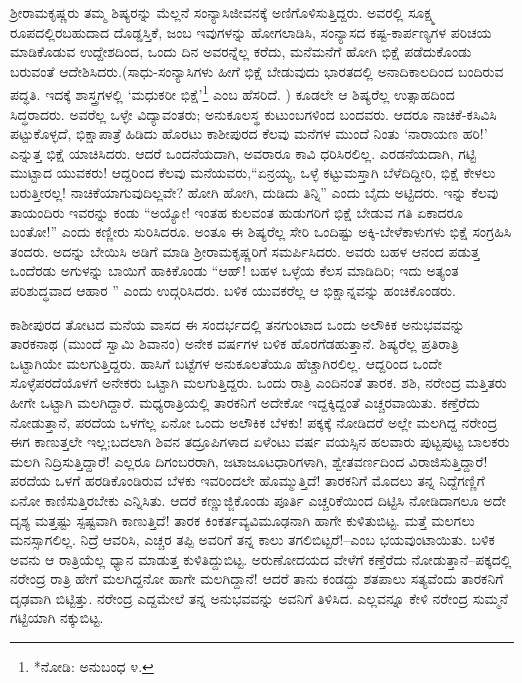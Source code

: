 ಶ್ರೀರಾಮಕೃಷ್ಣರು ತಮ್ಮ ಶಿಷ್ಯರನ್ನು ಮೆಲ್ಲನೆ ಸಂನ್ಯಾಸಿಜೀವನಕ್ಕೆ ಅಣಿಗೊಳಿಸುತ್ತಿದ್ದರು. ಅವರಲ್ಲಿ ಸೂಕ್ಷ್ಮ ರೂಪದಲ್ಲಿರಬಹುದಾದ ದೊಡ್ಡಸ್ತಿಕೆ, ಜಂಬ ಇವುಗಳನ್ನು ಹೋಗಲಾಡಿಸಿ, ಸಂನ್ಯಾಸದ ಕಷ್ಟ-ಕಾರ್ಪಣ್ಯಗಳ ಪರಿಚಯ ಮಾಡಿಕೊಡುವ ಉದ್ದೇಶದಿಂದ, ಒಂದು ದಿನ ಅವರನ್ನೆಲ್ಲ ಕರೆದು, ಮನೆಮನೆಗೆ ಹೋಗಿ ಭಿಕ್ಷೆ ಪಡೆದುಕೊಂಡು ಬರುವಂತೆ ಆದೇಶಿಸಿದರು.(ಸಾಧು-ಸಂನ್ಯಾಸಿಗಳು ಹೀಗೆ ಭಿಕ್ಷೆ ಬೇಡುವುದು ಭಾರತದಲ್ಲಿ ಅನಾದಿಕಾಲದಿಂದ ಬಂದಿರುವ ಪದ್ಧತಿ. ಇದಕ್ಕೆ ಶಾಸ್ತ್ರಗಳಲ್ಲಿ ‘ಮಧುಕರೀ ಭಿಕ್ಷೆ’\footnote{*ನೋಡಿ: ಅನುಬಂಧ ೪.} ಎಂಬ ಹೆಸರಿದೆ. ) ಕೂಡಲೇ ಆ ಶಿಷ್ಯರೆಲ್ಲ ಉತ್ಸಾಹದಿಂದ ಸಿದ್ಧರಾದರು. ಅವರೆಲ್ಲ ಒಳ್ಳೇ ವಿದ್ಯಾವಂತರು; ಅನುಕೂಲಸ್ಥ ಕುಟುಂಬಗಳಿಂದ ಬಂದವರು. ಆದರೂ ನಾಚಿಕೆ-ಕಸಿವಿಸಿ ಪಟ್ಟುಕೊಳ್ಳದೆ, ಭಿಕ್ಷಾಪಾತ್ರೆ ಹಿಡಿದು ಹೊರಟು ಕಾಶೀಪುರದ ಕೆಲವು ಮನೆಗಳ ಮುಂದೆ ನಿಂತು ‘ನಾರಾಯಣ ಹರಿ!’ ಎನ್ನುತ್ತ ಭಿಕ್ಷೆ ಯಾಚಿಸಿದರು. ಆದರೆ ಒಂದನೆಯದಾಗಿ, ಅವರಾರೂ ಕಾವಿ ಧರಿಸಿರಲಿಲ್ಲ. ಎರಡನೆಯದಾಗಿ, ಗಟ್ಟಿ ಮುಟ್ಟಾದ ಯುವಕರು! ಆದ್ದರಿಂದ ಕೆಲವು ಮನೆಯವರು,“ಏನ್ರಯ್ಯ, ಒಳ್ಳೆ ಕಟ್ಟುಮಸ್ತಾಗಿ ಬೆಳೆದಿದ್ದೀರಿ, ಭಿಕ್ಷೆ ಕೇಳಲು ಬರುತ್ತೀರಲ್ಲ! ನಾಚಿಕೆಯಾಗುವುದಿಲ್ಲವೇ? ಹೋಗಿ ಹೋಗಿ, ದುಡಿದು ತಿನ್ನಿ” ಎಂದು ಬೈದು ಅಟ್ಟಿದರು. ಇನ್ನು ಕೆಲವು ತಾಯಂದಿರು ಇವರನ್ನು ಕಂಡು “ಅಯ್ಯೋ! ಇಂತಹ ಕುಲವಂತ ಹುಡುಗರಿಗೆ ಭಿಕ್ಷೆ ಬೇಡುವ ಗತಿ ಏಕಾದರೂ ಬಂತೋ!” ಎಂದು ಕಣ್ಣೀರು ಸುರಿಸಿದರೂ. ಅಂತೂ ಈ ಶಿಷ್ಯರೆಲ್ಲ ಸೇರಿ ಒಂದಿಷ್ಟು ಅಕ್ಕಿ-ಬೇಳೆಕಾಳುಗಳು ಭಿಕ್ಷೆ ಸಂಗ್ರಹಿಸಿ ತಂದರು. ಅದನ್ನು ಬೇಯಿಸಿ ಅಡಿಗೆ ಮಾಡಿ ಶ್ರೀರಾಮಕೃಷ್ಣರಿಗೆ ಸಮರ್ಪಿಸಿದರು. ಅವರು ಬಹಳ ಆನಂದ ಪಡುತ್ತ ಒಂದೆರಡು ಅಗುಳನ್ನು ಬಾಯಿಗೆ ಹಾಕಿಕೊಂಡು “ಆಹ್! ಬಹಳ ಒಳ್ಳೆಯ ಕೆಲಸ ಮಾಡಿದಿರಿ; ಇದು ಅತ್ಯಂತ ಪರಿಶುದ್ಧವಾದ ಆಹಾರ ” ಎಂದು ಉದ್ಗರಿಸಿದರು. ಬಳಿಕ ಯುವಕರೆಲ್ಲ ಆ ಭಿಕ್ಷಾನ್ನವನ್ನು ಹಂಚಿಕೊಂಡರು.

ಕಾಶೀಪುರದ ತೋಟದ ಮನೆಯ ವಾಸದ ಈ ಸಂದರ್ಭದಲ್ಲಿ ತನಗುಂಟಾದ ಒಂದು ಅಲೌಕಿಕ ಅನುಭವವನ್ನು ತಾರಕನಾಥ (ಮುಂದೆ ಸ್ವಾಮಿ ಶಿವಾನಂ) ಅನೇಕ ವರ್ಷಗಳ ಬಳಿಕ ಹೊರಗೆಡಹುತ್ತಾನೆ. ಶಿಷ್ಯರೆಲ್ಲ ಪ್ರತಿರಾತ್ರಿ ಒಟ್ಟಾಗಿಯೇ ಮಲಗುತ್ತಿದ್ದರು. ಹಾಸಿಗೆ ಬಟ್ಟೆಗಳ ಅನುಕೂಲತೆಯೂ ಹೆಚ್ಚಾಗಿರಲಿಲ್ಲ. ಆದ್ದರಿಂದ ಒಂದೇ ಸೊಳ್ಳೆಪರದೆಯೊಳಗೆ ಅನೇಕರು ಒಟ್ಟಾಗಿ ಮಲಗುತ್ತಿದ್ದರು. ಒಂದು ರಾತ್ರಿ ಎಂದಿನಂತೆ ತಾರಕ. ಶಶಿ, ನರೇಂದ್ರ ಮತ್ತಿತರು ಹೀಗೇ ಒಟ್ಟಾಗಿ ಮಲಗಿದ್ದಾರೆ. ಮಧ್ಯರಾತ್ರಿಯಲ್ಲಿ ತಾರಕನಿಗೆ ಅದೇಕೋ ಇದ್ದಕ್ಕಿದ್ದಂತೆ ಎಚ್ಚರವಾಯಿತು. ಕಣ್ತೆರೆದು ನೋಡುತ್ತಾನೆ, ಪರದೆಯ ಒಳಗೆಲ್ಲ ಏನೋ ಒಂದು ಅಲೌಕಿಕ ಬೆಳಕು! ಪಕ್ಕಕ್ಕೆ ನೋಡಿದರೆ ಅಲ್ಲೇ ಮಲಗಿದ್ದ ನರೇಂದ್ರ ಈಗ ಕಾಣುತ್ತಲೇ ಇಲ್ಲ;ಬದಲಾಗಿ ಶಿವನ ತದ್ರೂಪಿಗಳಾದ ಏಳೆಂಟು ವರ್ಷ ವಯಸ್ಸಿನ ಹಲವಾರು ಪುಟ್ಟಪುಟ್ಟ ಬಾಲಕರು ಮಲಗಿ ನಿದ್ರಿಸುತ್ತಿದ್ದಾರೆ! ಎಲ್ಲರೂ ದಿಗಂಬರರಾಗಿ, ಜಟಾಜೂಟಧಾರಿಗಳಾಗಿ, ಶ್ವೇತವರ್ಣದಿಂದ ವಿರಾಜಿಸುತ್ತಿದ್ದಾರೆ! ಪರದೆಯ ಒಳಗೆ ಹರಡಿಕೊಂಡಿರುವ ಬೆಳಕು ಇವರಿಂದಲೇ ಹೊಮ್ಮುತ್ತಿದೆ! ತಾರಕನಿಗೆ ಮೊದಲು ತನ್ನ ನಿದ್ದೆಗಣ್ಣಿಗೆ ಏನೋ ಕಾಣಿಸುತ್ತಿರಬೇಕು ಎನ್ನಿಸಿತು. ಆದರೆ ಕಣ್ಣುಜ್ಜಿಕೊಂಡು ಪೂರ್ತಿ ಎಚ್ಚರಿಕೆಯಿಂದ ದಿಟ್ಟಿಸಿ ನೋಡಿದಾಗಲೂ ಅದೇ ದೃಶ್ಯ ಮತ್ತಷ್ಟು ಸ್ಪಷ್ಟವಾಗಿ ಕಾಣುತ್ತಿದೆ! ತಾರಕ ಕಿಂಕರ್ತವ್ಯವಿಮೂಢನಾಗಿ ಹಾಗೇ ಕುಳಿತುಬಿಟ್ಟ. ಮತ್ತೆ ಮಲಗಲು ಮನಸ್ಸಾಗಲಿಲ್ಲ. ನಿದ್ರೆ ಆವರಿಸಿ, ಎಚ್ಚರ ತಪ್ಪಿ ಅವರಿಗೆ ತನ್ನ ಕಾಲು ತಗಲಿಬಿಟ್ಟರೆ!–ಎಂಬ ಭಯವುಂಟಾಯಿತು. ಬಳಿಕ ಅವನು ಆ ರಾತ್ರಿಯೆಲ್ಲ ಧ್ಯಾನ ಮಾಡುತ್ತ ಕುಳಿತಿದ್ದುಬಿಟ್ಟ. ಅರುಣೋದಯದ ವೇಳೆಗೆ ಕಣ್ತೆರೆದು ನೋಡುತ್ತಾನೆ–ಪಕ್ಕದಲ್ಲಿ ನರೇಂದ್ರ ರಾತ್ರಿ ಹೇಗೆ ಮಲಗಿದ್ದನೋ ಹಾಗೇ ಮಲಗಿದ್ದಾನೆ! ಆದರೆ ತಾನು ಕಂಡದ್ದು ಶತಪಾಲು ಸತ್ಯವೆಂದು ತಾರಕನಿಗೆ ದೃಢವಾಗಿ ಬಿಟ್ಟಿತ್ತು. ನರೇಂದ್ರ ಎದ್ದಮೇಲೆ ತನ್ನ ಅನುಭವವನ್ನು ಅವನಿಗೆ ತಿಳಿಸಿದ. ಎಲ್ಲವನ್ನೂ ಕೇಳಿ ನರೇಂದ್ರ ಸುಮ್ಮನೆ ಗಟ್ಟಿಯಾಗಿ ನಕ್ಕುಬಿಟ್ಟ.

